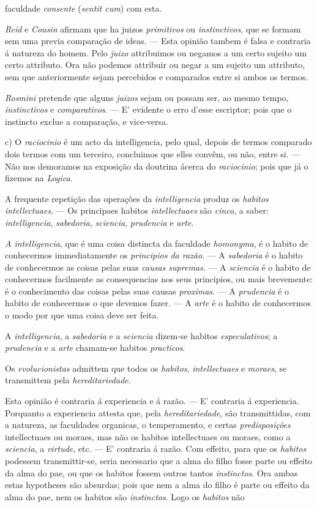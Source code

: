 faculdade \emph{consente} (\emph{sentit cum}) com esta.\par \emph{Reid} e \emph{Cousin} afirmam que ha juizos \emph{primitivos} ou \emph{instinctivos}, que se formam sem uma previa comparação de ideas. --- Esta opinião tambem é falsa e contraria á natureza do homem. Pelo \emph{juizo} attribuimos ou negamos a um certo sujeito um certo attributo. Ora não podemos attribuir ou negar a um sujeito um attributo, sem que anteriormente sejam percebidos e comparados entre si ambos os termos.\par \emph{Rosmini} pretende que alguns \emph{juizos} sejam ou possam ser, ao mesmo tempo, \emph{instinctivos} e \emph{comparativos}. --- E' evidente o erro d'esse escriptor; pois que o instincto exclue a comparação, e vice-versa.\par c) O \emph{raciocinio} é um acto da intelligencia, pelo qual, depois de termos comparado dois termos com um terceiro, concluimos que elles convêm, ou não, entre si. --- Não nos demoramos na exposição da doutrina ácerca do \emph{raciocinio}; pois que já o fizemos na \emph{Logica}.\par *\par A frequente repetição das operações da \emph{intelligencia} produz os \emph{habitos intellectuaes}. --- Os principaes habitos \emph{intellectuaes} são \emph{cinco}, a saber: \emph{intelligencia}, \emph{sabedoria}, \emph{sciencia}, \emph{prudencia} e \emph{arte}.\par \emph{A intelligencia}, que é uma coisa distincta da faculdade \emph{homonyma}, é o habito de conhecermos immediatamente os \emph{principios da razão}. --- A \emph{sabedoria} é o habito de conhecermos as coisas pelas suas \emph{causas supremas}. --- A \emph{sciencia} é o habito de conhecermos facilmente as consequencias nos seus principios, ou mais brevemente: é o conhecimento das coisas pelas suas causas \emph{proximas}. --- A \emph{prudencia} é o habito de conhecermos o que devemos fazer. --- A \emph{arte} é o habito de conhecermos o modo por que uma coisa deve ser feita.\par A \emph{intelligencia}, a \emph{sabedoria} e a \emph{sciencia} dizem-se habitos \emph{especulativos}; a \emph{prudencia} e a \emph{arte} chamam-se habitos \emph{practicos}.\par Os \emph{evolucionistas} admittem que todos os \emph{habitos}, \emph{intellectuaes} e \emph{moraes}, se transmittem pela \emph{hereditariedade}.\par Esta opinião é contraria á experiencia e á razão. --- E' contraria á experiencia. Porquanto a experiencia attesta que, pela \emph{hereditariedade}, são transmittidas, com a natureza, as faculdades organicas, o temperamento, e certas \emph{predisposições} intellectuaes ou moraes, mas não os habitos intellectuaes ou moraes, como a \emph{sciencia}, a \emph{virtude}, etc. --- E' contraria á razão. Com effeito, para que os \emph{habitos} podessem transmittir-se, seria necessario que a alma do filho fosse parte ou effeito da alma do pae, ou que os habitos fossem outros tantos \emph{instinctos}. Ora ambas estas hypotheses são absurdas; pois que nem a alma do filho é parte ou effeito da alma do pae, nem os habitos são \emph{instinctos}. Logo os \emph{habitos} não 